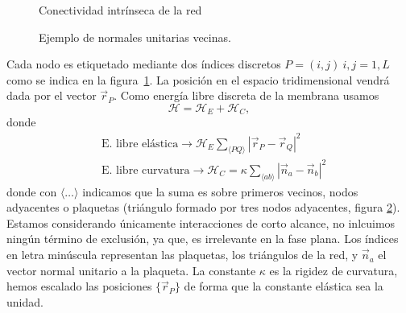 \begin{figure}[h]
\centering
\resizebox{275bp}{!}{}
\caption{Conectividad intrínseca de la red}\label{red_rombo}
\end{figure}
\begin{figure}[h]
\centering
\resizebox{\columnwidth}{!}{}
\caption{Ejemplo de normales unitarias vecinas.}\label{normales-adyacentes-fig}
\end{figure}
Cada nodo es etiquetado mediante dos índices discretos $P=(i,j)\ i,j=1,L$
como se indica en la figura~\ref{red_rombo}. La posición en el espacio
tridimensional vendrá dada por el vector $\vec{r}_P$. Como energía libre
discreta de la membrana \cite{Bowick_flat_phase} usamos
\begin{equation*}
\mathcal{H}=\mathcal{H}_E+\mathcal{H}_C,
\end{equation*}
donde
\begin{align}
&\text{E. libre  elástica}\rightarrow \mathcal{H}_E\sum_{\langle PQ
  \rangle}|\vec{r}_P-\vec{r}_Q|^2\label{Hd_elastico}\\
&\text{E. libre curvatura}\rightarrow \mathcal{H}_C=\kappa\sum_{\langle ab \rangle}|\vec{n}_a-\vec{n}_b|^2\label{Hd_curvatura} 
\end{align}
donde con $\langle\dots\rangle$ indicamos que la suma es sobre primeros vecinos,
nodos adyacentes o plaquetas (triángulo formado por tres nodos adyacentes,
figura \ref{normales-adyacentes-fig}). Estamos considerando únicamente interacciones de corto
alcance,  no inlcuimos ningún término de exclusión, ya que, es irrelevante en
la fase plana. Los  índices en letra minúscula representan las plaquetas, 
los triángulos de la red, y $\vec{n}_{a}$ el vector normal unitario a la plaqueta. La
constante $\kappa$ es la rigidez de curvatura, hemos escalado las posiciones $\{\vec{r}_P\}$ de
forma que la constante elástica sea la unidad.


